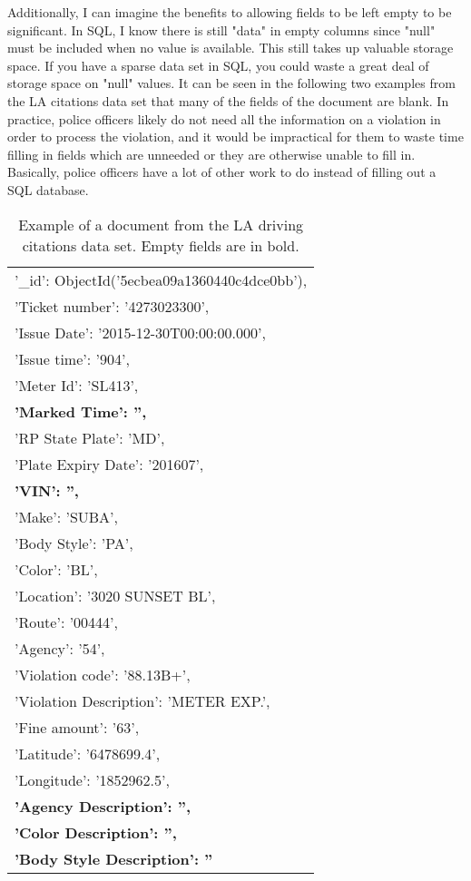 \documentclass[]{article}
\begin{document}
Additionally, I can imagine the benefits to allowing fields to be left empty to be significant.  In SQL, I know there is still "data" in empty columns since "null" must be included when no value is available.  This still takes up valuable storage space.  If you have a sparse data set in SQL, you could waste a great deal of storage space on "null" values.  It can be seen in the following two examples from the LA citations data set that many of the fields of the document are blank.  In practice, police officers likely do not need all the information on a violation in order to process the violation, and it would be impractical for them to waste time filling in fields which are unneeded or they are otherwise unable to fill in.  Basically, police officers have a lot of other work to do instead of filling out a SQL database.
\pagebreak
\begin{table}[!ht]
	\begin{center}
		\caption{Example of a document from the LA driving citations data set.  Empty fields are in bold.}
		\label{tab:table1}
		\begin{tabular}{|l|} 
			\hline
			'\_id': ObjectId('5ecbea09a1360440c4dce0bb'),\\
			'Ticket number': '4273023300',\\
			'Issue Date': '2015-12-30T00:00:00.000',\\
			'Issue time': '904',\\
			'Meter Id': 'SL413',\\
			\textbf{'Marked Time': '',}\\
			'RP State Plate': 'MD',\\
			'Plate Expiry Date': '201607',\\
			\textbf{'VIN': '',}\\
			'Make': 'SUBA',\\
			'Body Style': 'PA',\\
			'Color': 'BL',\\
			'Location': '3020 SUNSET BL',\\
			'Route': '00444',\\
			'Agency': '54',\\
			'Violation code': '88.13B+',\\
			'Violation Description': 'METER EXP.',\\
			'Fine amount': '63',\\
			'Latitude': '6478699.4',\\
			'Longitude': '1852962.5',\\
			\textbf{'Agency Description': '',}\\
			\textbf{'Color Description': '',}\\
			\textbf{'Body Style Description': ''}\\
			\hline
		\end{tabular}
	\end{center}
\end{table}
\end{document}
